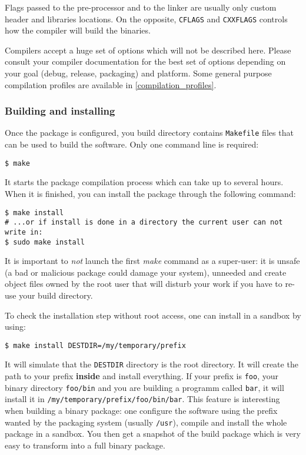 Flags passed to the pre-processor and to the linker are usually only
custom header and libraries locations. On the opposite,
\texttt{CFLAGS} and \texttt{CXXFLAGS} controls how the compiler will
build the binaries.

Compilers accept a huge set of options which will not be described
here. Please consult your compiler documentation for the best set of
options depending on your goal (debug, release, packaging) and
platform. Some general purpose compilation profiles are available in
\autoref{compilation_profiles}.


\subsubsection{Building and installing}


Once the package is configured, you build directory contains
\texttt{Makefile} files that can be used to build the software.
Only one command line is required:

\begin{verbatim}
$ make
\end{verbatim}


It starts the package compilation process which can take up to several
hours. When it is finished, you can install the package through the
following command:

\begin{verbatim}
$ make install
# ...or if install is done in a directory the current user can not write in:
$ sudo make install
\end{verbatim}

It is important to \emph{not} launch the first \emph{make} command as
a super-user: it is unsafe (a bad or malicious package could damage
your system), unneeded and create object files owned by the root user
that will disturb your work if you have to re-use your build
directory.


To check the installation step without root access, one can install in a sandbox by using:
\begin{verbatim}
$ make install DESTDIR=/my/temporary/prefix
\end{verbatim}

It will simulate that the \texttt{DESTDIR} directory is the root
directory. It will create the path to your prefix \textbf{inside} and
install everything. If your prefix is \texttt{foo}, your binary
directory \texttt{foo/bin} and you are building a programm called
\texttt{bar}, it will install it in
\texttt{/my/temporary/prefix/foo/bin/bar}.  This feature is
interesting when building a binary package: one configure the software
using the prefix wanted by the packaging system (usually
\texttt{/usr}), compile and install the whole package in a
sandbox. You then get a snapshot of the build package which is very
easy to transform into a full binary package.
